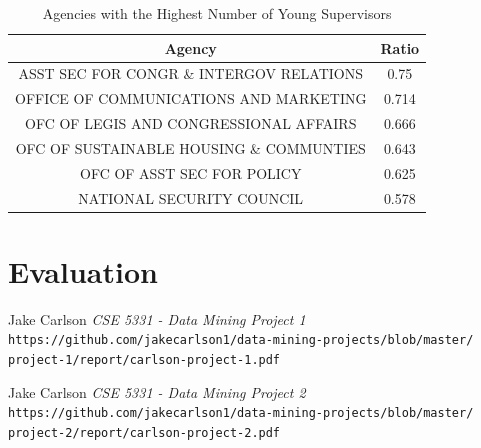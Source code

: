 \documentclass{article}
\begin{document}
    \begin{center}
        \begin{table}
            \centering
            \begin{tabular}{ |c|c| }
                \hline
                Agency & Ratio \\
                \hline
                ASST SEC FOR CONGR \& INTERGOV RELATIONS & 0.75 \\
                OFFICE OF COMMUNICATIONS AND MARKETING & 0.714 \\
                OFC OF LEGIS AND CONGRESSIONAL AFFAIRS & 0.666 \\
                OFC OF SUSTAINABLE HOUSING \& COMMUNTIES & 0.643 \\
                OFC OF ASST SEC FOR POLICY & 0.625 \\
                NATIONAL SECURITY COUNCIL & 0.578 \\
                \hline
            \end{tabular}
            \caption{Agencies with the Highest Number of Young Supervisors}
            \label{tab:9}
        \end{table}
    \end{center}

\section{Evaluation}

\begin{thebibliography}{10}
    Jake Carlson
    \textit{CSE 5331 - Data Mining Project 1}
    \texttt{https://github.com/jakecarlson1/data-mining-projects/blob/master/}
    \texttt{project-1/report/carlson-project-1.pdf}

    Jake Carlson
    \textit{CSE 5331 - Data Mining Project 2}
    \texttt{https://github.com/jakecarlson1/data-mining-projects/blob/master/}
    \texttt{project-2/report/carlson-project-2.pdf}

\end{thebibliography}
\end{document}
